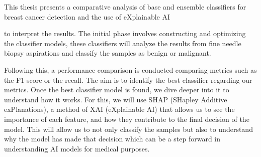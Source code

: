 This thesis presents a comparative analysis of base and ensemble classifiers for breast cancer detection and the use of eXplainable AI


to interpret the results. The initial phase involves constructing and optimizing the classifier models, these classifiers will analyze the results from fine needle biopsy aspirations and classify the samples as benign or malignant.

Following this, a performance comparison is conducted comparing metrics such as the F1 score or the recall. The aim is to identify the best classifier regarding our metrics. Once the best classifier model is found, we dive deeper into it to understand how it works. For this, we will use SHAP (SHapley Additive exPlanations), a method of XAI (eXplainable AI) that allows us to see the importance of each feature, and how they contribute to the final decision of the model. This will allow us to not only classify the samples but also to understand why the model has made that decision which can be a step forward in understanding AI models for medical purposes.





